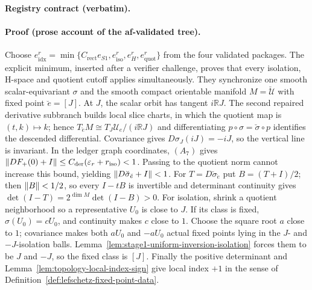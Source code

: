 \noindent\textbf{Registry contract (verbatim).}

\paragraph{Proof (prose account of the af-validated tree).}
Choose
$e_{\mathrm{idx}}^r=\min\{C_{\mathrm{rect}}e_{S1},e_{\mathrm{iso}}^r,
e_H^r,e_{\mathrm{quot}}^r\}$ from the four validated packages.
The explicit minimum, inserted after a verifier challenge, proves that every isolation,
H-space and quotient cutoff applies simultaneously.
They synchronize one smooth scalar-equivariant $\sigma$ and the smooth compact orientable
manifold $M=\breve{\mathcal U}$ with fixed point $\breve e=[J]$.
At $J$, the scalar orbit has tangent $i\mathbb RJ$.
The second repaired derivative subbranch builds local slice charts, in which the quotient
map is $(t,k)\mapsto k$; hence
$T_{\breve e}M\cong T_J\mathcal U_e/(i\mathbb RJ)$ and differentiating
$p\circ\sigma=\breve\sigma\circ p$ identifies the descended differential.
Covariance gives $D\sigma_J(iJ)=-iJ$, so the vertical line is invariant.
In the ledger graph coordinates, $(A_7)$ gives
$\lVert DF_+(0)+I\rVert\le C_{\mathrm{der}}(\varepsilon_r+r_{\mathrm{iso}})<1$.
Passing to the quotient norm cannot increase this bound, yielding
$\lVert D\breve\sigma_{\breve e}+I\rVert<1$.
For $T=D\breve\sigma_{\breve e}$ put $B=(T+I)/2$; then $\lVert B\rVert<1/2$,
so every $I-tB$ is invertible and determinant continuity gives
$\det(I-T)=2^{\dim M}\det(I-B)>0$.
For isolation, shrink a quotient neighborhood so a representative $U_0$ is close to $J$.
If its class is fixed, $\sigma(U_0)=cU_0$, and continuity makes $c$ close to $1$.
Choose the square root $a$ close to $1$; covariance makes both $aU_0$ and $-aU_0$
actual fixed points lying in the $J$- and $-J$-isolation balls.
Lemma~\ref{lem:stage1-uniform-inversion-isolation} forces them to be $J$ and $-J$,
so the fixed class is $[J]$.  Finally the positive determinant and
Lemma~\ref{lem:topology-local-index-sign} give local index $+1$ in the sense of
Definition~\ref{def:lefschetz-fixed-point-data}.
